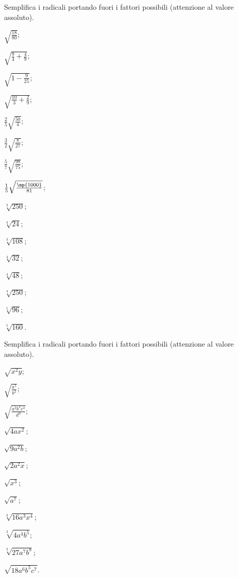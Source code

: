 \begin{esercizio}[\Ast]
 \label{ese:2.53}
Semplifica i radicali portando fuori i fattori possibili (attenzione al valore assoluto).
 \begin{multicols}{3}
 \begin{enumeratea}
 \item $\sqrt{\frac{18}{80}}$;
 \item $\sqrt{\frac 9 4+\frac 4 9}$;
 \item $\sqrt{1-\frac 9{25}}$;
 \item $\sqrt{\frac{10} 3+\frac 2 9}$;
 \item $\frac 2 5\sqrt{\frac{50} 4}$;
 \item $\frac 3 2\sqrt{\frac 8{27}}$;
 \item $\frac 5 7\sqrt{\frac{98}{75}}$;
 \item $\frac 1 5\sqrt{\frac{\np{1000}}{81}}$;
 \item $\sqrt[3]{250}$;
 \item $\sqrt[3]{24}$;
 \item $\sqrt[3]{108}$;
 \item $\sqrt[4]{32}$;
 \item $\sqrt[4]{48}$;
 \item $\sqrt[4]{250}$;
 \item $\sqrt[5]{96}$;
 \item $\sqrt[5]{160}$.
 \end{enumeratea}
 \end{multicols}
\end{esercizio}

\begin{esercizio}[\Ast]
 \label{ese:2.54}
Semplifica i radicali portando fuori i fattori possibili (attenzione al valore assoluto).
 \begin{multicols}{3}
 \begin{enumeratea}
 \item $\sqrt{x^2y}$;
 \item $\sqrt{\frac{a^5}{b^2}}$;
 \item $\sqrt{\frac{a^2b^3c^3}{d^9}}$;
 \item $\sqrt{4ax^2}$;
 \item $\sqrt{9a^2b}$;
 \item $\sqrt{2a^2x}$;
 \item $\sqrt{x^3}$;
 \item $\sqrt{a^7}$;
 \item $\sqrt[3]{16a^3x^4}$;
 \item $\sqrt[3]{4a^4b^5}$;
 \item $\sqrt[3]{27a^7b^8}$;
 \item $\sqrt{18a^6b^5c^7}$.
 \end{enumeratea}
 \end{multicols}
\end{esercizio}


